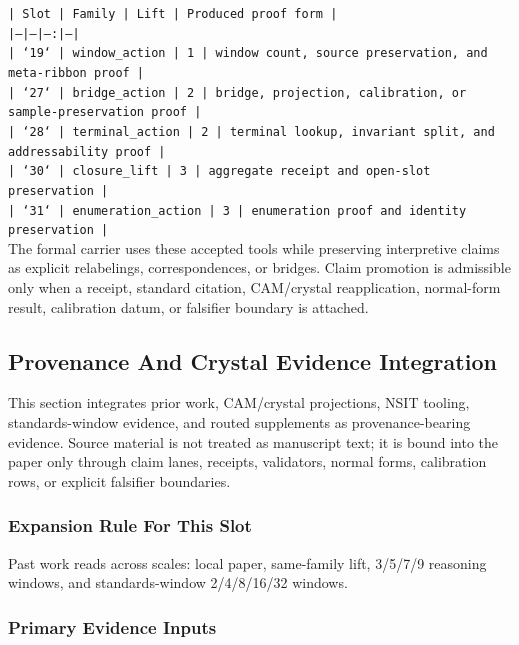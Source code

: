 \documentclass[11pt]{article}
\begin{document}
\noindent\texttt{| Slot | Family | Lift | Produced proof form |}\\
\noindent\texttt{|---|---|---:|---|}\\
\noindent\texttt{| `19` | window\_action | 1 | window count, source preservation, and meta-ribbon proof |}\\
\noindent\texttt{| `27` | bridge\_action | 2 | bridge, projection, calibration, or sample-preservation proof |}\\
\noindent\texttt{| `28` | terminal\_action | 2 | terminal lookup, invariant split, and addressability proof |}\\
\noindent\texttt{| `30` | closure\_lift | 3 | aggregate receipt and open-slot preservation |}\\
\noindent\texttt{| `31` | enumeration\_action | 3 | enumeration proof and identity preservation |}\\

The formal carrier uses these accepted tools while preserving interpretive
claims as explicit relabelings, correspondences, or bridges. Claim promotion is admissible only when a receipt, standard citation,
CAM/crystal reapplication, normal-form result, calibration datum, or falsifier
boundary is attached.

\subsection*{Provenance And Crystal Evidence Integration}

This section integrates prior work, CAM/crystal projections, NSIT tooling,
standards-window evidence, and routed supplements as provenance-bearing
evidence. Source material is not treated as manuscript text; it is bound into
the paper only through claim lanes, receipts, validators, normal forms,
calibration rows, or explicit falsifier boundaries.

\subsubsection*{Expansion Rule For This Slot}

Past work reads across scales: local paper, same-family lift, 3/5/7/9 reasoning windows, and standards-window 2/4/8/16/32 windows.

\subsubsection*{Primary Evidence Inputs}
\end{document}
